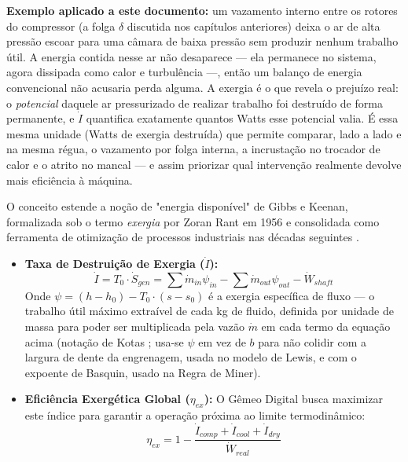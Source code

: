 \documentclass[12pt,a4paper]{article}
\numberwithin{equation}{section}
\numberwithin{table}{section}
\numberwithin{figure}{section}
\begin{document}
\textbf{Exemplo aplicado a este documento:} um vazamento interno entre os rotores do compressor (a folga $\delta$ discutida nos capítulos anteriores) deixa o ar de alta pressão escoar para uma câmara de baixa pressão sem produzir nenhum trabalho útil. A energia contida nesse ar não desaparece — ela permanece no sistema, agora dissipada como calor e turbulência —, então um balanço de energia convencional não acusaria perda alguma. A exergia é o que revela o prejuízo real: o \textit{potencial} daquele ar pressurizado de realizar trabalho foi destruído de forma permanente, e $\dot{I}$ quantifica exatamente quantos Watts esse potencial valia. É essa mesma unidade (Watts de exergia destruída) que permite comparar, lado a lado e na mesma régua, o vazamento por folga interna, a incrustação no trocador de calor e o atrito no mancal — e assim priorizar qual intervenção realmente devolve mais eficiência à máquina.

O conceito estende a noção de "energia disponível" de Gibbs e Keenan, formalizada sob o termo \textit{exergia} por Zoran Rant em 1956 e consolidada como ferramenta de otimização de processos industriais nas décadas seguintes \cite{bejan}.

\begin{itemize}
	\item \textbf{Taxa de Destruição de Exergia ($\dot{I}$):}
	\begin{equation}\label{eq:s17-3}
\dot{I} = T_0 \cdotp \dot{S}_{gen} = \sum \dot{m}_{in} \psi_{in} - \sum \dot{m}_{out} \psi_{out} - \dot{W}_{shaft}
\end{equation}
	Onde $\psi = (h - h_0) - T_0 \cdotp (s - s_0)$ é a exergia específica de fluxo — o trabalho útil máximo extraível de cada kg de fluido, definida por unidade de massa para poder ser multiplicada pela vazão $\dot{m}$ em cada termo da equação acima (notação de Kotas \cite{bejan}; usa-se $\psi$ em vez de $b$ para não colidir com a largura de dente da engrenagem, usada no modelo de Lewis, e com o expoente de Basquin, usado na Regra de Miner).
	
	\item \textbf{Eficiência Exergética Global ($\eta_{ex}$):}
	O Gêmeo Digital busca maximizar este índice para garantir a operação próxima ao limite termodinâmico:
	\begin{equation}\label{eq:s17-4}
\eta_{ex} = 1 - \frac{\dot{I}_{comp} + \dot{I}_{cool} + \dot{I}_{dry}}{\dot{W}_{real}}
\end{equation}
\end{itemize}
\end{document}
